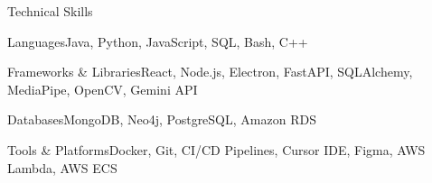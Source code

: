 \documentclass[
	11pt
]{../resume}
\begin{document}
	\begin{rSection}{T}{echnical Skills}
		\begin{rSet}{Languages}{Java, Python, JavaScript, SQL, Bash, C++}
		\end{rSet}
		\begin{rSet}{Frameworks \& Libraries}{React, Node.js, Electron, FastAPI, SQLAlchemy, MediaPipe, OpenCV, Gemini API}
		\end{rSet}
		\begin{rSet}{Databases}{MongoDB, Neo4j, PostgreSQL, Amazon RDS}
		\end{rSet}
		\begin{rSet}{Tools \& Platforms}{Docker, Git, CI/CD Pipelines, Cursor IDE, Figma, AWS Lambda, AWS ECS}
		\end{rSet}
	\end{rSection}
\end{document}
